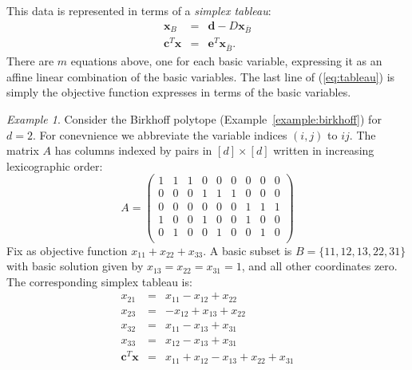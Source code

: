 \documentclass{amsbook}
\newcommand{\xx}{\mathbf x}
\newcommand{\cc}{\mathbf c}
\theoremstyle{definition}
\theoremstyle{remark}
\newtheorem{example}[theorem]{Example}
\begin{document}
This data is represented in terms of a \emph{simplex tableau}:
\begin{equation}
  \tag{T}
  \label{eq:tableau}
  \begin{matrix}
    \xx_B & = & \mathbf d - D\xx_{\bar B}\\
    \hline
    \cc^T\xx & = & \mathbf e^T \xx_{\bar B}.
  \end{matrix}
\end{equation}
There are $m$ equations above, one for each basic variable, expressing it as an affine linear combination of the basic variables.
The last line of (\ref{eq:tableau}) is simply the objective function expresses in terms of the basic variables.
\begin{example}
  Consider the Birkhoff polytope (Example~\ref{example:birkhoff}) for $d=2$.
  For conevnience we abbreviate the variable indices $(i,j)$ to $ij$.
  The matrix $A$ has columns indexed by pairs in $[d]\times [d]$ written in increasing lexicographic order:
  \begin{displaymath}
    A =
    \begin{pmatrix}
      1 & 1 & 1 & 0 & 0 & 0 & 0 & 0 & 0\\
      0 & 0 & 0 & 1 & 1 & 1 & 0 & 0 & 0\\
      0 & 0 & 0 & 0 & 0 & 0 & 1 & 1 & 1\\
      1 & 0 & 0 & 1 & 0 & 0 & 1 & 0 & 0\\
      0 & 1 & 0 & 0 & 1 & 0 & 0 & 1 & 0\\
    \end{pmatrix}
  \end{displaymath}
  Fix as objective function $x_{11}+x_{22}+x_{33}$.
  A basic subset is $B=\{11,12,13,22,31\}$ with basic solution given by $x_{13}=x_{22}=x_{31}=1$, and all other coordinates zero.
  The corresponding simplex tableau is:
  \begin{displaymath}
    \begin{matrix}
      x_{21} & = & x_{11} -x_{12}+x_{22}\\
      x_{23} & = & -x_{12}+x_{13}+x_{22}\\
      x_{32} & = & x_{11} - x_{13} + x_{31}\\
      x_{33} & = & x_{12} -x_{13}+x_{31}\\
      \hline
      \cc^T\xx & = & x_{11} + x_{12} - x_{13} + x_{22} + x_{31} 
    \end{matrix}
  \end{displaymath}
\end{example}
\end{document}
